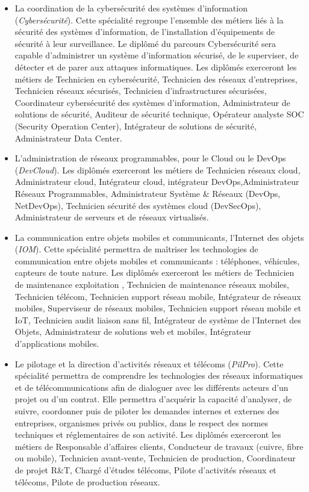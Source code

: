\medskip
\begin{itemize}[leftmargin=5ex]
	\item La coordination de la cybersécurité des systèmes d'information ({\em Cybersécurité}). Cette spécialité regroupe l'ensemble des métiers liés à la sécurité des systèmes d'information, de l'installation d'équipements de sécurité à leur surveillance. Le diplômé du parcours Cybersécurité sera capable d'administrer un système d'information sécurisé, de le superviser, de détecter et de parer aux attaques informatiques. Les diplômés exerceront les métiers de Technicien en cybersécurité, Technicien des réseaux d'entreprises, Technicien réseaux sécurisés, Technicien d'infrastructures sécurisées, Coordinateur cybersécurité des systèmes d'information, Administrateur de solutions de sécurité, Auditeur de sécurité technique, Opérateur analyste SOC (Security Operation Center), Intégrateur de solutions de sécurité, Administrateur Data Center.
	
	\item L'administration de réseaux programmables, pour le Cloud ou le DevOps ({\em DevCloud}). Les diplômés exerceront les métiers de Technicien réseaux cloud, Administrateur cloud, Intégrateur cloud, intégrateur DevOps,Administrateur Réseaux Programmables, Administrateur Système \& Réseaux (DevOps, NetDevOps), Technicien sécurité des systèmes cloud (DevSecOps), Administrateur de serveurs et de réseaux virtualisés.
	
	\item La communication entre objets mobiles et communicants, l'Internet des objets ({\em IOM}). Cette spécialité permettra de maîtriser les technologies de communication entre objets mobiles et communi\-cants : téléphones, véhicules, capteurs de toute nature. Les diplômés exerceront les métiers de Technicien de maintenance exploitation , Technicien de maintenance réseaux mobiles, Technicien télécom, Technicien support réseau mobile, Intégrateur de réseaux mobiles, Superviseur de réseaux mobiles, Technicien support réseau mobile et IoT, Technicien audit liaison sans fil, Intégrateur de système de l’Internet des Objets, Administrateur de solutions web et mobiles, Intégrateur d’applications mobiles.
	
	\item Le pilotage et la direction d'activités réseaux et télécoms ({\em PilPro}). Cette spécialité permettra de comprendre les technologies des réseaux informatiques et de télécommunications afin de dialoguer avec les différents acteurs d’un projet ou d’un contrat. Elle permettra d’acquérir la capacité d’analyser, de suivre, coordonner puis de piloter les demandes internes et externes des entreprises, organismes privés ou publics, dans le respect des normes techniques et réglementaires de son activité. Les diplômés exerceront les métiers de Responsable d'affaires clients, Conducteur de travaux (cuivre, fibre ou mobile), Technicien avant-vente, Technicien de production, Coordinateur de projet R\&T, Chargé d’études télécoms, Pilote d’activités réseaux et télécoms, Pilote de production réseaux.
	

\end{itemize}
